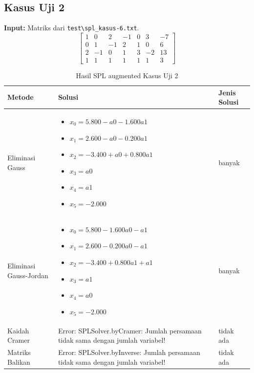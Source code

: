 \documentclass[12pt,a4paper]{report}
\begin{document}
\subsection{Kasus Uji 2}
\textbf{Input:} Matriks dari \texttt{test\textbackslash spl\_kasus-6.txt}.
\[
\left[\begin{array}{cccccc|c}
     1& 0 &2 &-1 &0 &3 &-7 \\
    0 &1 &-1 &2 &1 &0& 6 \\
    2 &-1 &0& 1& 3 &-2 &13 \\
    1 &1 &1 &1 &1 &1 &3
\end{array}\right]
\]
 
\begin{table}[H]
    \centering
    \caption{Hasil SPL augmented Kasus Uji 2}
    \begin{tabular}{|l|p{5cm}|l|}
        \hline
        \textbf{Metode} & \textbf{Solusi} & \textbf{Jenis Solusi} \\
        \hline
        Eliminasi Gauss & 
        \begin{itemize}
            \item $x_0 = 5.800 - a0 - 1.600a1$
            \item $x_1 = 2.600 - a0 - 0.200a1$
            \item $x_2 = -3.400 + a0 + 0.800a1$
            \item $x_3 = a0$
            \item $x_4 = a1$
            \item $x_5 = -2.000$
        \end{itemize}
        & banyak \\
        \hline
        Eliminasi Gauss-Jordan & 
        \begin{itemize}
            \item $x_0 = 5.800 - 1.600a0 - a1$
            \item $x_1 = 2.600 - 0.200a0 - a1$
            \item $x_2 = -3.400 + 0.800a1 + a1 $
            \item $x_3 = a1$
            \item $x_4 = a0$
            \item $x_5 = -2.000$
        \end{itemize}
        & banyak \\
        \hline
        Kaidah Cramer & 
        Error: SPLSolver.byCramer: Jumlah persamaan tidak sama dengan jumlah variabel!
        & tidak ada  \\
        \hline
        Matriks Balikan & 
        Error: SPLSolver.byInverse: Jumlah persamaan tidak sama dengan jumlah variabel!
        & tidak ada  \\
        \hline
    \end{tabular}
\end{table}
\end{document}
